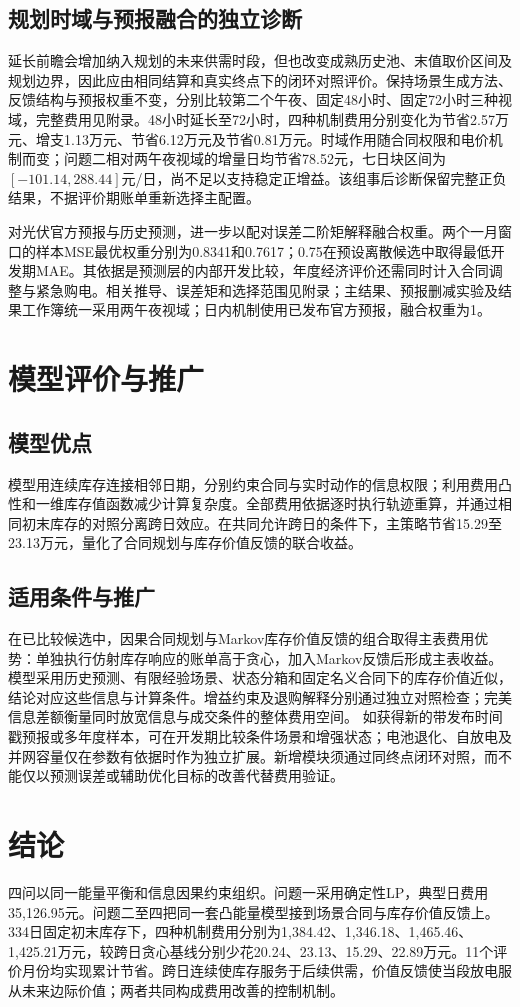 \documentclass[UTF8,a4paper,zihao=-4,fontset=mac]{ctexart}
\begin{document}
\subsection{规划时域与预报融合的独立诊断}
延长前瞻会增加纳入规划的未来供需时段，但也改变成熟历史池、末值取价区间及规划边界，因此应由相同结算和真实终点下的闭环对照评价。保持场景生成方法、反馈结构与预报权重不变，分别比较第二个午夜、固定48小时、固定72小时三种视域，完整费用见附录。48小时延长至72小时，四种机制费用分别变化为节省2.57万元、增支1.13万元、节省6.12万元及节省0.81万元。时域作用随合同权限和电价机制而变；问题二相对两午夜视域的增量日均节省78.52元，七日块区间为$[-101.14,288.44]$元/日，尚不足以支持稳定正增益。该组事后诊断保留完整正负结果，不据评价期账单重新选择主配置。

对光伏官方预报与历史预测，进一步以配对误差二阶矩解释融合权重。两个一月窗口的样本MSE最优权重分别为0.8341和0.7617；0.75在预设离散候选中取得最低开发期MAE。其依据是预测层的内部开发比较，年度经济评价还需同时计入合同调整与紧急购电。相关推导、误差矩和选择范围见附录；主结果、预报删减实验及结果工作簿统一采用两午夜视域；日内机制使用已发布官方预报，融合权重为1。

\section{模型评价与推广}
\subsection{模型优点}
模型用连续库存连接相邻日期，分别约束合同与实时动作的信息权限；利用费用凸性和一维库存值函数减少计算复杂度。全部费用依据逐时执行轨迹重算，并通过相同初末库存的对照分离跨日效应。在共同允许跨日的条件下，主策略节省15.29至23.13万元，量化了合同规划与库存价值反馈的联合收益。
\subsection{适用条件与推广}
在已比较候选中，因果合同规划与Markov库存价值反馈的组合取得主表费用优势：单独执行仿射库存响应的账单高于贪心，加入Markov反馈后形成主表收益。模型采用历史预测、有限经验场景、状态分箱和固定名义合同下的库存价值近似，结论对应这些信息与计算条件。增益约束及退购解释分别通过独立对照检查；完美信息差额衡量同时放宽信息与成交条件的整体费用空间。
如获得新的带发布时间戳预报或多年度样本，可在开发期比较条件场景和增强状态；电池退化、自放电及并网容量仅在参数有依据时作为独立扩展。新增模块须通过同终点闭环对照，而不能仅以预测误差或辅助优化目标的改善代替费用验证。
\section{结论}
四问以同一能量平衡和信息因果约束组织。问题一采用确定性LP，典型日费用35,126.95元。问题二至四把同一套凸能量模型接到场景合同与库存价值反馈上。334日固定初末库存下，四种机制费用分别为1,384.42、1,346.18、1,465.46、1,425.21万元，较跨日贪心基线分别少花20.24、23.13、15.29、22.89万元。11个评价月份均实现累计节省。跨日连续使库存服务于后续供需，价值反馈使当段放电服从未来边际价值；两者共同构成费用改善的控制机制。
\end{document}
